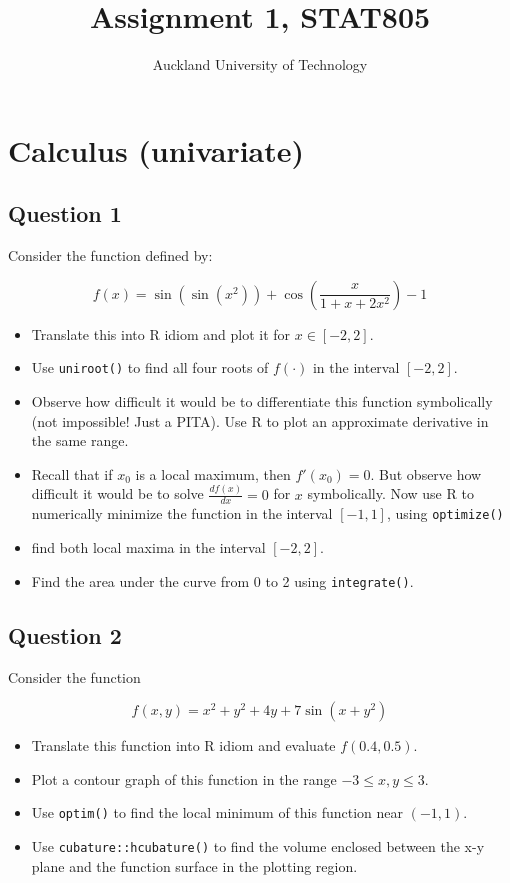 \documentclass[nojss]{jss}\usepackage[]{graphicx}\usepackage[]{color}
\author{Auckland University of Technology}
\title{Assignment 1, STAT805}
\begin{document}
  
\section{Calculus (univariate)}


\subsection*{Question 1}

Consider the  function defined by:

\[
f(x) = \sin(\sin(x^2)) + \cos\left(\frac{x}{1+x+2x^2}\right)-1
\]


\begin{itemize}
\item Translate this into R idiom and plot it for
  $x\in\left[-2,2\right]$.
  \item Use {\tt uniroot()} to find all four roots of $f(\cdot)$ in
    the interval $\left[-2,2\right]$.
\item Observe how difficult it would be to differentiate this function
  symbolically (not impossible!  Just a PITA).  Use R to plot an
  approximate derivative in the same range.
\item Recall that if $x_0$ is a local maximum, then
  $f'(x_0)=0$.  But observe how difficult it would be to solve
  $\frac{df(x)}{dx}=0$ for $x$ symbolically.  Now use R to numerically minimize the
  function in the interval $\left[-1,1\right]$, using {\tt optimize()}
  \item find both local maxima in the interval $\left[-2,2\right]$.
\item Find the area under the curve from 0 to 2 using {\tt integrate()}. 
\end{itemize}

\subsection*{Question 2}

Consider the function

\[  
f(x,y) = x^2+y^2+4y+ 7\sin(x+y^2)
\]

\begin{itemize}
\item Translate this function into R idiom and evaluate $f(0.4,0.5)$.
\item Plot a contour graph of this function in the range $-3\leq x,y\leq 3$.
\item Use {\tt optim()} to find the local minimum of this function near
$(-1,1)$.
\item Use {\tt cubature::hcubature()} to find the volume enclosed
between the x-y plane and the function surface in the plotting region.
\end{itemize}
    
\end{document}
